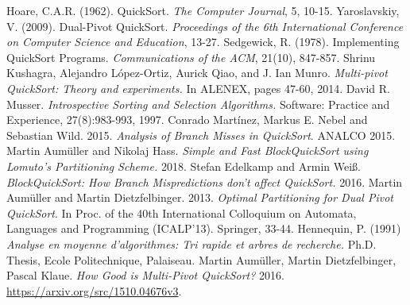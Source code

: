 \documentclass[a4paper,oneside,12pt]{book}
\begin{document}
\begin{thebibliography}{99}

 \label{HoareQuickSort} Hoare, C.A.R. (1962). QuickSort. \textit{The Computer Journal}, 5, 10-15.
 \label{Yaroslavskiy} Yaroslavskiy, V. (2009). Dual-Pivot QuickSort. \textit{Proceedings of the 6th International Conference on Computer Science and Education}, 13-27.
 \label{Sedgewick} Sedgewick, R. (1978). Implementing QuickSort Programs. \textit{Communications of the ACM}, 21(10), 847-857.
 \label{Kushagra} Shrinu Kushagra, Alejandro López-Ortiz, Aurick Qiao, and J. Ian Munro. \textit{Multi-pivot QuickSort: Theory and experiments.} In ALENEX, pages 47-60, 2014.
 \label{Introsort} David R. Musser. \textit{Introspective Sorting and Selection Algorithms.} Software: Practice and Experience, 27(8):983-993, 1997.
 \label{AnalysisOfBranchMissesInQuickSort} Conrado Martínez, Markus E. Nebel and Sebastian Wild. 2015. \textit{Analysis of Branch Misses in QuickSort}. ANALCO 2015.
 \label{BlockQuickSortLomuto} Martin Aumüller and Nikolaj Hass. \textit{Simple and Fast BlockQuickSort using Lomuto's Partitioning Scheme.} 2018.
 \label{BlockQuickSort} Stefan Edelkamp and Armin Weiß. \textit{BlockQuickSort: How Branch Mispredictions don't affect QuickSort.} 2016.
 \label{OptimalPartitioningForDualPivotQuickSort} Martin Aumüller and Martin Dietzfelbinger. 2013. \textit{Optimal Partitioning for Dual Pivot QuickSort}. In Proc.
of the 40th International Colloquium on Automata, Languages and Programming (ICALP'13). Springer, 33-44.
 \label{Hennequin} Hennequin, P. (1991) \textit{Analyse en moyenne d'algorithmes: Tri rapide et arbres de recherche.} Ph.D. Thesis, Ecole Politechnique, Palaiseau.
 \label{HowGoodIsMultiPivotQuickSort} Martin Aumüller, Martin Dietzfelbinger, Pascal Klaue. \textit{How Good is Multi-Pivot QuickSort?} 2016. \url{https://arxiv.org/src/1510.04676v3}.
\end{thebibliography}
\end{document}
